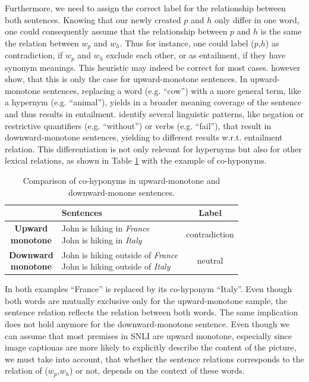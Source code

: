 \noindent
Furthermore, we need to assign the correct label for the relationship between both sentences. Knowing that our newly created $p$ and $h$ only differ in one word, one could consequently assume that the relationship between $p$ and $h$ is the same the relation between $w_p$ and $w_h$. Thus for instance, one could label ($p$,$h$) as contradiction, if $w_p$ and $w_h$ exclude each other, or as entailment, if they have synonym meanings. This heuristic may indeed be correct for most cases. \cite{maccartney2007natural} however show, that this is only the case for upward-monotone sentences. In upward-monotone sentences, replacing a word (e.g. ``cow'') with a more general term, like a hypernym (e.g. ``animal''), yields in a broader meaning coverage of the sentence and thus results in entailment. \cite{maccartney2007natural} identify several linguistic patterns, like negation or restrictive quantifiers (e.g. ``without'') or verbs (e.g. ``fail''), that result in downward-monotone sentences, yielding to different results w.r.t. entailment relation. This differentiation is not only relevant for hypernyms but also for other lexical relations, as shown in Table \ref{tab:monoton_samples} with the example of co-hyponyms.
\begin{table}[htt]
\centering
\begin{tabular}{c|lc}
& \textbf{Sentences} & \textbf{Label} \\
\toprule
\specialcellc{\textbf{Upward}\\\textbf{monotone}} & \specialcell{John is hiking in \textit{France}\\John is hiking in \textit{Italy}} & contradiction \\
\midrule
\specialcellc{\textbf{Downward}\\\textbf{monotone}} & \specialcell{John is hiking outside of \textit{France}\\John is hiking outside of \textit{Italy}} & neutral \\
\bottomrule
\end{tabular}
\label{tab:monoton_samples}
 \caption{Comparison of co-hyponyms in upward-monotone and downward-monone sentences.}
\end{table}
In both examples ``France'' is replaced by its co-hyponym ``Italy''. Even though both words are mutually exclusive only for the upward-monotone sample, the sentence relation reflects the relation between both words. The same implication does not hold anymore for the downward-monotone sentence. Even though we can assume that most premises in \ac{SNLI} are upward monotone, especially since image captionas are more likely to explicitly describe the content of the picture, we must take into account, that whether the sentence relations corresponds to the relation of ($w_p$,$w_h$) or not, depends on the context of these words.

